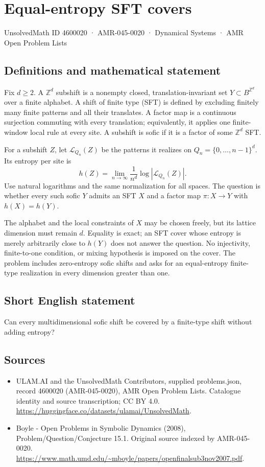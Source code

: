 \documentclass[11pt,a4paper]{article}
\begin{document}
\section*{Equal-entropy SFT covers}\label{4600020}
{\small UnsolvedMath ID 4600020 · AMR-045-0020 · Dynamical Systems · AMR Open Problem Lists}
\subsection{Definitions and mathematical statement}
Fix $d\ge2$. A $\mathbb Z^d$ subshift is a nonempty closed,
translation-invariant set $Y\subset B^{\mathbb Z^d}$ over a finite
alphabet. A shift of finite type (SFT) is defined by excluding finitely
many finite patterns and all their translates. A factor map is a
continuous surjection commuting with every translation; equivalently,
it applies one finite-window local rule at every site. A subshift is
sofic if it is a factor of some $\mathbb Z^d$ SFT.

For a subshift $Z$, let $\mathcal L_{Q_n}(Z)$ be the patterns it realizes
on $Q_n=\{0,\ldots,n-1\}^d$. Its entropy per site is
\[
 h(Z)=\lim_{n\to\infty}\frac{1}{n^d}
                         \log|\mathcal L_{Q_n}(Z)|.
\]
Use natural logarithms and the same normalization for all spaces.
The question is whether every such sofic $Y$ admits an SFT $X$ and
a factor map $\pi:X\to Y$ with $h(X)=h(Y)$.

The alphabet and the local constraints of $X$ may be chosen freely,
but its lattice dimension must remain $d$. Equality is exact; an SFT
cover whose entropy is merely arbitrarily close to $h(Y)$ does not
answer the question. No injectivity, finite-to-one condition, or mixing
hypothesis is imposed on the cover. The problem includes zero-entropy
sofic shifts and asks for an equal-entropy finite-type realization in
every dimension greater than one.
\subsection{Short English statement}
Can every multidimensional sofic shift be covered by a finite-type shift without adding entropy?
\subsection{Sources}
\begin{itemize}
\item[S1] ULAM.AI and the UnsolvedMath Contributors, supplied problems.json, record 4600020 (AMR-045-0020), AMR Open Problem Lists. Catalogue identity and source transcription; CC BY 4.0.
\url{https://huggingface.co/datasets/ulamai/UnsolvedMath}.
\item[S2] Boyle - Open Problems in Symbolic Dynamics (2008), Problem/Question/Conjecture 15.1. Original source indexed by AMR-045-0020.
\url{https://www.math.umd.edu/~mboyle/papers/openfinalsub3nov2007.pdf}.
\end{itemize}
\end{document}
